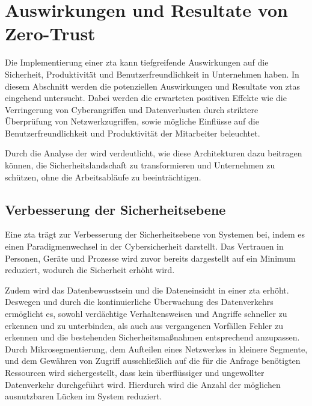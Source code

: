 \newpage
\section{Auswirkungen und Resultate von Zero-Trust}\label{sec:auswirkungen-und-resultate-von-zero-trust}
Die Implementierung einer \ac{zta} kann tiefgreifende Auswirkungen auf die Sicherheit, Produktivität und Benutzerfreundlichkeit in Unternehmen haben.
In diesem Abschnitt werden die potenziellen Auswirkungen und Resultate von \acp{zta} eingehend untersucht.
Dabei werden die erwarteten positiven Effekte wie die Verringerung von Cyberangriffen und Datenverlusten durch striktere Überprüfung von Netzwerkzugriffen, sowie mögliche Einflüsse auf die Benutzerfreundlichkeit und Produktivität der Mitarbeiter beleuchtet.

Durch die Analyse der   wird verdeutlicht, wie diese Architekturen dazu beitragen können, die Sicherheitslandschaft zu transformieren und Unternehmen zu schützen, ohne die Arbeitsabläufe zu beeinträchtigen.

\subsection{Verbesserung der Sicherheitsebene}\label{subsec:verbesserung-der-sicherheitsebene}
Eine \ac{zta} trägt zur Verbesserung der Sicherheitsebene von Systemen bei, indem es einen Paradigmenwechsel in der Cybersicherheit darstellt.
Das Vertrauen in Personen, Geräte und Prozesse wird zuvor bereits dargestellt auf ein Minimum reduziert, wodurch die Sicherheit erhöht wird.

Zudem wird das Datenbewusstsein und die Dateneinsicht in einer \ac{zta} erhöht.
Deswegen und durch die kontinuierliche Überwachung des Datenverkehrs ermöglicht es, sowohl verdächtige Verhaltensweisen und Angriffe schneller zu erkennen und zu unterbinden, als auch aus vergangenen Vorfällen Fehler zu erkennen und die bestehenden Sicherheitsmaßnahmen entsprechend anzupassen.\autocites[\vglf][]{cunningham-2019}[\vglf][]{buck-2021}
Durch Mikrosegmentierung, dem Aufteilen eines Netzwerkes in kleinere Segmente, und dem Gewähren von Zugriff ausschließlich auf die für die Anfrage benötigten Ressourcen wird sichergestellt, dass kein überflüssiger und ungewollter Datenverkehr durchgeführt wird.\autocite[\vglf][]{shore-2021}
Hierdurch wird die Anzahl der möglichen ausnutzbaren Lücken im System reduziert.

